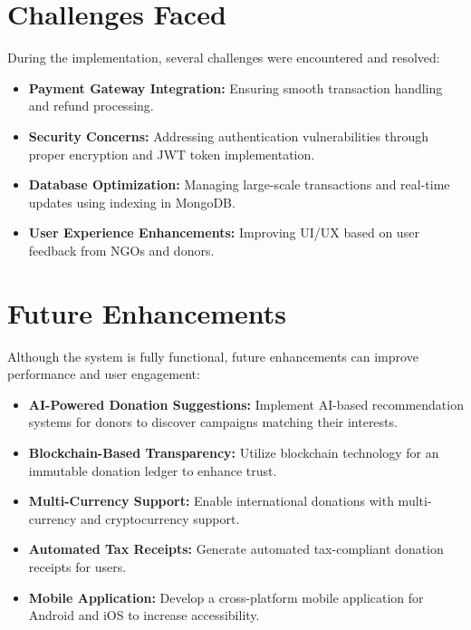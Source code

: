 \section{Challenges Faced}
During the implementation, several challenges were encountered and resolved:
\begin{itemize}
    \item \textbf{Payment Gateway Integration:} Ensuring smooth transaction handling and refund processing.
    \item \textbf{Security Concerns:} Addressing authentication vulnerabilities through proper encryption and JWT token implementation.
    \item \textbf{Database Optimization:} Managing large-scale transactions and real-time updates using indexing in MongoDB.
    \item \textbf{User Experience Enhancements:} Improving UI/UX based on user feedback from NGOs and donors.
\end{itemize}

\section{Future Enhancements}
Although the system is fully functional, future enhancements can improve performance and user engagement:
\begin{itemize}
    \item \textbf{AI-Powered Donation Suggestions:} Implement AI-based recommendation systems for donors to discover campaigns matching their interests.
    \item \textbf{Blockchain-Based Transparency:} Utilize blockchain technology for an immutable donation ledger to enhance trust.
    \item \textbf{Multi-Currency Support:} Enable international donations with multi-currency and cryptocurrency support.
    \item \textbf{Automated Tax Receipts:} Generate automated tax-compliant donation receipts for users.
    \item \textbf{Mobile Application:} Develop a cross-platform mobile application for Android and iOS to increase accessibility.
\end{itemize}